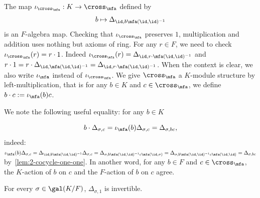 \begin{construction}[$K$-embedding]\label{con:cross-product-iota}
  The map $\iota_{\cross_{\mfa}}: K \to \cross_{\mfa}$ defined by
  \[
    b \mapsto \Delta_{\id, b\mfa(\id,\id)^{-1}}
  \]
  is an $F$-algebra map.
  Checking that $\iota_{\cross_{\mfa}}$ preserves $1$, multiplication and addition uses nothing but axioms of ring.
  For any $r \in F$, we need to check $\iota_{\cross_{\mfa}}(r) = r \cdot 1$. Indeed $\iota_{\cross_{\mfa}}(r) = \Delta_{\id, r\cdot \mfa(\id,\id)^{-1}}$ and $r\cdot 1 = r \cdot \Delta_{\id,\mfa(\id,\id)^{-1}} =\Delta_{\id,r\cdot\mfa(\id,\id)^{-1}}$.
  When the context is clear, we also write $\iota_{\mfa}$ instead of $\iota_{\cross_{\mfa}}$. We give $\cross_{\mfa}$ a $K$-module structure by left-multiplication, that is for any $b \in K$ and $c\in\cross_{\mfa}$, we define $b\cdot c := \iota_{\mfa}(b)c$.


  We note the following useful equality: for any $b \in K$

  \[
    b\cdot \Delta_{\sigma,c} = \iota_{\mfa}(b)\Delta_{\sigma, c} = \Delta_{\sigma, bc},
  \]
  indeed:
  $\iota_{\mfa}(b)\Delta_{\sigma, c} = \Delta_{\id,b \mfa(\id,\id)^{-1}}\Delta_{\sigma, c} = \Delta_{\sigma, b\mfa(\id,\id)^{-1}c\mfa(\id,\sigma)} = \Delta_{\sigma,b\mfa(\id,\id)^{-1}c\mfa(\id,\id)} = \Delta_{\sigma, bc}$ by~\cref{lem:2-cocycle-one-one}. In another word, for any $b \in F$ and $c \in \cross_{\mfa}$, the $K$-action of $b$ on $c$ and the $F$-action of $b$ on $c$ agree.

  \leanok {}
 \end{construction}

 \begin{lemma}
   \label{lem:cross-product-delta-invertible}
   For every $\sigma \in \gal(K/F)$, $\Delta_{\sigma,1}$ is invertible.
   \leanok
 \end{lemma}

